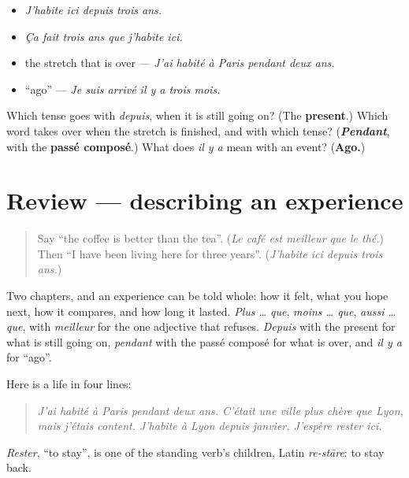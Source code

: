 \begin{itemize}
\raggedright
  \item \emph{J'habite ici depuis trois ans.}
  \item \emph{Ça fait trois ans que j'habite ici.}
  \item the stretch that is over — \emph{J'ai habité à Paris pendant deux ans.}
  \item \textquotedblleft{}ago\textquotedblright{} — \emph{Je suis arrivé il y a trois mois.}
\end{itemize}

\begin{tcolorbox}[breakable,colback=teal!4,colframe=teal!35!black,title={Before you move on}]
Which tense goes with \emph{depuis}, when it is still going on? (The \textbf{present}.) Which word takes over when the stretch is finished, and with which tense? (\emph{\textbf{Pendant}}, with the \textbf{passé composé}.) What does \emph{il y a} mean with an event? (\textbf{Ago.})
\end{tcolorbox}
\section[(review)]{Review — describing an experience}

\label{lesson:FR-C265-revision-experience}



\begin{quote}
Say \textquotedblleft{}the coffee is better than the tea\textquotedblright{}. (\emph{Le café est meilleur que le thé.}) Then \textquotedblleft{}I have been living here for three years\textquotedblright{}. (\emph{J'habite ici depuis trois ans.})
\end{quote}

\begin{grammarlens}[title={What you've built}]
Two chapters, and an experience can be told whole: how it felt, what you hope next, how it compares, and how long it lasted. \emph{Plus … que}, \emph{moins … que}, \emph{aussi … que}, with \emph{meilleur} for the one adjective that refuses. \emph{Depuis} with the present for what is still going on, \emph{pendant} with the passé composé for what is over, and \emph{il y a} for \textquotedblleft{}ago\textquotedblright{}.

Here is a life in four lines:

\begin{quote}
\emph{J'ai habité à Paris pendant deux ans. C'était une ville plus chère que Lyon, mais j'étais content. J'habite à Lyon depuis janvier. J'espère rester ici.}
\end{quote}

\emph{Rester}, \textquotedblleft{}to stay\textquotedblright{}, is one of the standing verb's children, Latin \emph{re-stāre}: to stay back.
\end{grammarlens}

